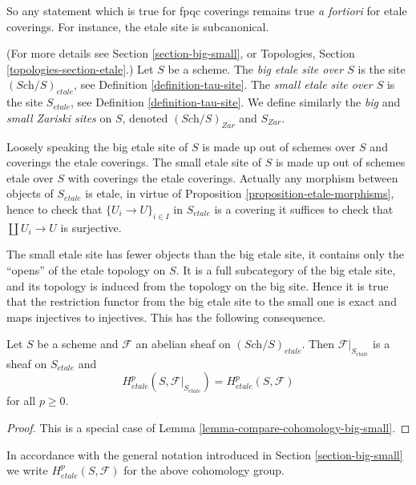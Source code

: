\noindent
So any statement which is true for fpqc coverings
remains true {\it a fortiori} for etale coverings. For
instance, the etale site is subcanonical.

\begin{definition}
\label{definition-big-etale-site}
(For more details see Section \ref{section-big-small}, or
Topologies, Section \ref{topologies-section-etale}.)
Let $S$ be a scheme.
The {\it big etale site over $S$} is the site
$(\textit{Sch}/S)_{etale}$, see
Definition \ref{definition-tau-site}.
The {\it small etale site over $S$} is the site $S_{etale}$, see
Definition \ref{definition-tau-site}.
We define similarly the {\it big} and {\it small Zariski sites} on $S$,
denoted $(\textit{Sch}/S)_{Zar}$ and $S_{Zar}$.
\end{definition}

\noindent
Loosely speaking the big etale site of $S$ is made up out of schemes over $S$
and coverings the etale coverings. The small etale site of $S$ is made up
out of schemes etale over $S$ with coverings the etale coverings.
Actually any morphism between objects of $S_{etale}$ is etale, in virtue of
Proposition \ref{proposition-etale-morphisms},
hence to check that $\{U_i \to U\}_{i \in I}$ in $S_{etale}$
is a covering it suffices to check that $\coprod U_i \to U$ is surjective.

\medskip\noindent
The small etale site has fewer objects than the big etale site, it
contains only the ``opens'' of the etale topology on $S$. It is a full
subcategory of the big etale site, and its topology is induced from the
topology on the big site. Hence it is true that the restriction functor
from the big etale site to the small one is exact and maps injectives to
injectives. This has the following consequence.

\begin{proposition}
\label{proposition-cohomology-restrict-small-site}
Let $S$ be a scheme and $\mathcal{F}$ an abelian sheaf on
$(\textit{Sch}/S)_{etale}$.
Then $\mathcal{F}|_{S_{etale}}$ is a sheaf on $S_{etale}$ and
$$
H^p_{etale}(S, \mathcal{F}|_{S_{etale}}) = H^p_{etale}(S, \mathcal{F})
$$
for all $p \geq 0$.
\end{proposition}

\begin{proof}
This is a special case of Lemma \ref{lemma-compare-cohomology-big-small}.
\end{proof}

\noindent
In accordance with the general notation introduced in
Section \ref{section-big-small}
we write $H_{etale}^p(S, \mathcal{F})$ for the above cohomology group.





